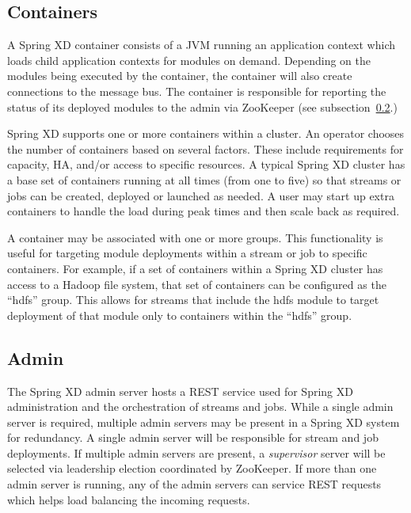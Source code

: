 \subsection{Containers}
A Spring XD container consists of a JVM running an application context which
loads child application contexts for modules on demand. Depending on the modules
being executed by the container, the container will also create connections to
the message bus. The container is responsible for reporting the status of its deployed
modules to the admin via ZooKeeper (see subsection~\ref{subsec:Admin}.)

Spring XD supports one or more containers within a cluster. An operator
chooses the number of containers based on several factors. These include requirements
for capacity, HA, and/or access to specific resources. A typical Spring XD cluster
has a base set of containers running at all times (from one to five) so that streams
or jobs can be created, deployed or launched as needed. A user may start up extra
containers to handle the load during peak times and then scale back as required.

A container may be associated with one or more groups. This functionality is useful
for targeting module deployments within a stream or job to specific containers.
For example, if a set of containers within a Spring XD cluster has access to
a Hadoop file system, that set of containers can be configured as the ``hdfs'' group.
This allows for streams that include the hdfs module to target deployment of
that module only to containers within the ``hdfs'' group.

\subsection{Admin}
\label{subsec:Admin}
The Spring XD admin server hosts a REST service used for Spring XD
administration and the orchestration of streams and jobs. While a single
admin server is required, multiple admin servers may be present in a Spring XD
system for redundancy. A single admin server will be responsible for stream
and job deployments. If multiple admin servers are present, a \emph{supervisor}
server will be selected via leadership election coordinated by ZooKeeper.
If more than one admin server is running, any of the admin servers
can service REST requests which helps load balancing the incoming requests.


